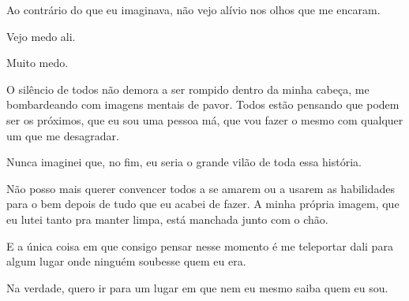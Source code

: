 Ao contrário do que eu imaginava, não vejo alívio nos olhos que me encaram.

Vejo medo ali.

Muito medo.

O silêncio de todos não demora a ser rompido dentro da minha cabeça, me bombardeando com imagens mentais de pavor. Todos estão pensando que podem ser os próximos, que eu sou uma pessoa má, que vou fazer o mesmo com qualquer um que me desagradar.

Nunca imaginei que, no fim, eu seria o grande vilão de toda essa história.

Não posso mais querer convencer todos a se amarem ou a usarem as habilidades para o bem depois de tudo que eu acabei de fazer. A minha própria imagem, que eu lutei tanto pra manter limpa, está manchada junto com o chão.

E a única coisa em que consigo pensar nesse momento é me teleportar dali para algum lugar onde ninguém soubesse quem eu era.

Na verdade, quero ir para um lugar em que nem eu mesmo saiba quem eu sou.

